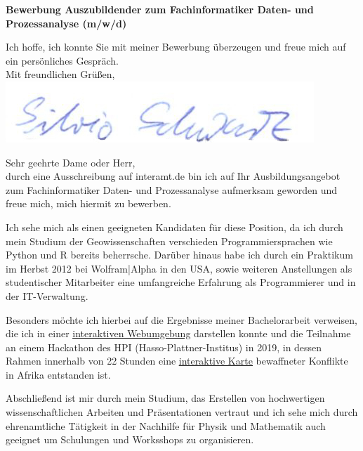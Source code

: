 \documentclass[11pt,a4paper,roman]{moderncv}
\begin{document}
\recipient{~}{ }
\date{\today}
\opening{\textbf{Bewerbung Auszubildender zum Fachinformatiker Daten- und Prozessanalyse (m/w/d)}}
\closing{Ich hoffe, ich konnte Sie mit meiner Bewerbung überzeugen und freue mich auf ein persönliches Gespräch.\\
\vspace{1cm}
Mit freundlichen Grüßen,\\ \vspace{0.2cm}
\includegraphics[scale=0.4]{../../img/Unterschrift_Silvio} \vspace{-1cm}
}
\makelettertitle

Sehr geehrte Dame oder Herr,\\
durch eine Ausschreibung auf interamt.de bin ich auf Ihr Ausbildungsangebot zum Fachinformatiker Daten- und Prozessanalyse aufmerksam geworden und freue mich, mich hiermit zu bewerben.

Ich sehe mich als einen geeigneten Kandidaten für diese Position, da ich durch mein Studium der Geowissenschaften verschieden Programmiersprachen wie Python und R bereits beherrsche. Darüber hinaus habe ich durch ein Praktikum im Herbst 2012 bei Wolfram|Alpha in den USA, sowie weiteren Anstellungen als studentischer Mitarbeiter eine umfangreiche Erfahrung als Programmierer und in der IT-Verwaltung.

Besonders möchte ich hierbei auf die Ergebnisse meiner Bachelorarbeit verweisen, die ich in einer \href{https://earthquake-distances.herokuapp.com/}{\color{pblue}\underline{interaktiven Webumgebung}} darstellen konnte und die Teilnahme an einem Hackathon des HPI (Hasso-Plattner-Institus) in 2019, in dessen Rahmen innerhalb von 22 Stunden eine \href{https://earthquake-distances.herokuapp.com}{\color{pblue}\underline{interaktive Karte}} bewaffneter Konflikte in Afrika entstanden ist.

Abschließend ist mir durch mein Studium, das Erstellen von hochwertigen wissenschaftlichen Arbeiten und Präsentationen vertraut und ich sehe mich durch  ehrenamtliche Tätigkeit in der Nachhilfe für Physik und Mathematik auch geeignet um Schulungen und Worksshops zu organisieren.\\


\makeletterclosing
\end{document}
